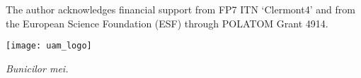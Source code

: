 \noindent
The author acknowledges financial support from FP7 ITN `Clermont4' and
from the European Science Foundation (ESF) through POLATOM Grant 4914.
\vspace{\baselineskip}


\begin{center}
\texttt{[image: uam\_logo]}  
\end{center}


\newpage

\thispagestyle{empty}

\phantom{text}

\vspace{2cm}

\begin{flushright}
  {\em Bunicilor mei.}
\end{flushright}

\newpage

\thispagestyle{empty}

